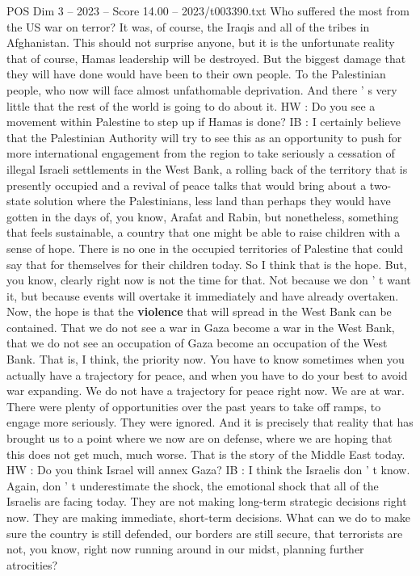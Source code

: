 \begin{textsample}{POS Dim 3 – 2023 – Score 14.00 – 2023/t003390.txt}
Who suffered the most from the US war on terror?
It was, of course, the Iraqis and all of the tribes in Afghanistan.
This should not surprise anyone, but it is the unfortunate reality that of course, Hamas leadership will be destroyed.
But the biggest damage that they will have done would have been to their own people.
To the Palestinian people, who now will face almost unfathomable deprivation.
And there ' s very little that the rest of the world is going to do about it.
HW : Do you see a movement within Palestine to step up if Hamas is done?
IB : I certainly believe that the Palestinian Authority will try to see this as an opportunity to push for more international engagement from the region to take seriously a cessation of illegal Israeli settlements in the West Bank, a rolling back of the territory that is presently occupied and a revival of peace talks that would bring about a two-state solution where the Palestinians, less land than perhaps they would have gotten in the days of, you know, Arafat and Rabin, but nonetheless, something that feels sustainable, a country that one might be able to raise children with a sense of hope.
There is no one in the occupied territories of Palestine that could say that for themselves for their children today.
So I think that is the hope.
But, you know, clearly right now is not the time for that.
Not because we don ' t want it, but because events will overtake it immediately and have already overtaken.
Now, the hope is that the \textbf{violence} that will spread in the West Bank can be contained.
That we do not see a war in Gaza become a war in the West Bank, that we do not see an occupation of Gaza become an occupation of the West Bank.
That is, I think, the priority now.
You have to know sometimes when you actually have a trajectory for peace, and when you have to do your best to avoid war expanding.
We do not have a trajectory for peace right now.
We are at war.
There were plenty of opportunities over the past years to take off ramps, to engage more seriously.
They were ignored.
And it is precisely that reality that has brought us to a point where we now are on defense, where we are hoping that this does not get much, much worse.
That is the story of the Middle East today.
HW : Do you think Israel will annex Gaza?
IB : I think the Israelis don ' t know.
Again, don ' t underestimate the shock, the emotional shock that all of the Israelis are facing today.
They are not making long-term strategic decisions right now.
They are making immediate, short-term decisions.
What can we do to make sure the country is still defended, our borders are still secure, that terrorists are not, you know, right now running around in our midst, planning further atrocities?

\end{textsample}
